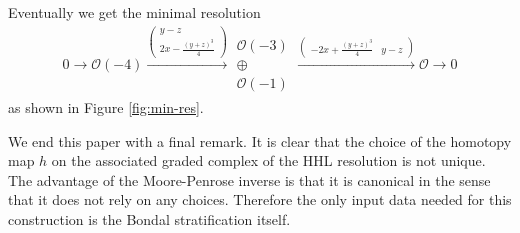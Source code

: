 \documentclass[11pt,reqno]{amsart}
\theoremstyle{definition}
\numberwithin{equation}{section}
\begin{document}
Eventually we get the minimal resolution
\begin{align*}
    0\rightarrow\mathcal{O}(-4)\xrightarrow{\begin{pmatrix} y-z \\ 2x-\frac{(y+z)^3}{4} \end{pmatrix}}\substack{ \mathcal{O}(-3) \\ \oplus \\ \mathcal{O}(-1) } \xrightarrow{\begin{pmatrix} -2x+\frac{(y+z)^3}{4} & y-z \end{pmatrix}} \mathcal{O}\rightarrow 0
\end{align*}
as shown in Figure \ref{fig:min-res}.

\medskip

We end this paper with a final remark. It is clear that the choice of the homotopy map $h$ on the associated graded complex of the HHL resolution is not unique. The advantage of the Moore-Penrose inverse is that it is canonical in the sense that it does not rely on any choices. Therefore the only input data needed for this construction is the Bondal stratification itself.

\smallskip
\end{document}
